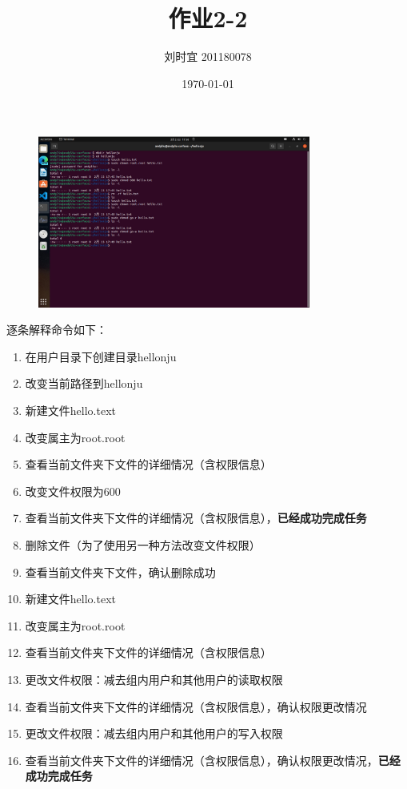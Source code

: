 \documentclass[UTF8]{ctexart}
\title{\textbf{作业2-2}}
\author{刘时宜 201180078}
\date{\today}
\begin{document}
    \maketitle
    \begin{figure}[H]
        \centering
        \includegraphics[width=0.8\textwidth]{hw2-2.jpg}
    \end{figure}
    逐条解释命令如下：
    \begin{enumerate}
        \item 在用户目录下创建目录hellonju
        \item 改变当前路径到hellonju
        \item 新建文件hello.text
        \item 改变属主为root.root
        \item 查看当前文件夹下文件的详细情况（含权限信息）
        \item 改变文件权限为600
        \item 查看当前文件夹下文件的详细情况（含权限信息），\textbf{已经成功完成任务}
        \item 删除文件（为了使用另一种方法改变文件权限）
        \item 查看当前文件夹下文件，确认删除成功
        \item 新建文件hello.text
        \item 改变属主为root.root
        \item 查看当前文件夹下文件的详细情况（含权限信息）
        \item 更改文件权限：减去组内用户和其他用户的读取权限
        \item 查看当前文件夹下文件的详细情况（含权限信息），确认权限更改情况
        \item 更改文件权限：减去组内用户和其他用户的写入权限
        \item 查看当前文件夹下文件的详细情况（含权限信息），确认权限更改情况，\textbf{已经成功完成任务}
    \end{enumerate}
\end{document}
